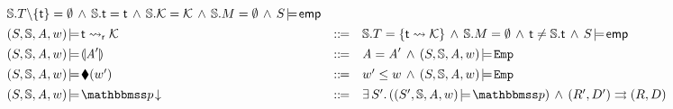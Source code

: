 \begin{figure*}[!t]
\[\begin{array}{lcl}
                \hpstate.\thrdpool\backslash\{\tid\} = \emptyset
                \,\land\,
                \hpstate.\tid = \tid 
                \,\land\,
                \hpstate.\hthrdlocalst = \hthrdlocalst
                \,\land\,
                \hpstate.\Mem = \emptyset
                \,\land\, \asrtmodel{\state}{\aemp}
                \\
                \\[-8pt]
            \asrtmodel{(\state, \hpstate, \primcom, \word)}
                {\astRdyCont{\thrdid}{\hthrdlocalst}} & \define &
                \hpstate.\thrdpool =\{ \thrdid \rightsquigarrow \hthrdlocalst \}
                \, \land \, \hpstate.\Mem = \emptyset \, \land \,
                \tid \neq \hpstate.\tid\,\land\, 
                \asrtmodel{\state}{\aemp} \\
            \\[-8pt]
            \asrtmodel{(\state, \hpstate, \primcom, \word)}
                {\safePrimAst{\primcom'}} & \define & 
                \primcom = \primcom' \, \land \, 
                \asrtmodel{(\state, \hpstate, \primcom, \word)}{\empAst} \\
            \\[-8pt]
            \asrtmodel{(\state, \hpstate, \primcom, \word)}
                {\metricAst{\word'}} 
            & \define & \word' \leq \word \, \land \, 
            \asrtmodel{(\state, \hpstate, \primcom, \word)}{\empAst} \\
            \\[-8pt]
            \asrtmodel{(\state, \hpstate, \primcom, \word)}{\nxtAst{\relastP}}
            & \define & 
            \exists \, \state'. \, 
            (\asrtmodel{(\state', \hpstate, \primcom, \word)}{\relastP}) 
            \, \land \, \Dstep{(\RFile', \DBuf')}{(\RFile, \DBuf)} \\ 

\end{array}\]
\end{figure*}

